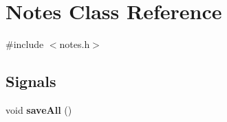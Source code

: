 \hypertarget{classNotes}{
\section{Notes Class Reference}
\label{classNotes}
}


{\ttfamily \#include $<$notes.h$>$}\subsection*{Signals}
\begin{DoxyCompactItemize}
\item 
\hypertarget{classNotes_af64a9989ad32ae85b75bc88e60ab6647}{
void {\bfseries saveAll} ()}
\label{classNotes_af64a9989ad32ae85b75bc88e60ab6647}

\end{DoxyCompactItemize}
